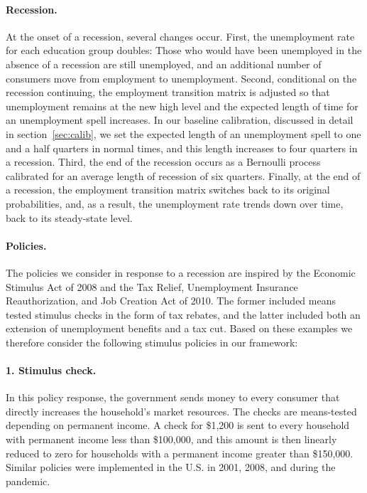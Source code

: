\documentclass[\econtexRoot/HAFiscal]{subfiles}
\begin{document}
\paragraph{Recession.} At the onset of a recession, several changes occur. First, the unemployment rate for each education group doubles: Those who would have been unemployed in the absence of a recession are still unemployed, and an additional number of consumers move from employment to unemployment. Second, conditional on the recession continuing, the employment transition matrix is adjusted so that unemployment remains at the new high level and the expected length of time for an unemployment spell increases. In our baseline calibration, discussed in detail in section~\ref{sec:calib}, we set the expected length of an unemployment spell to one and a half quarters in normal times, and this length increases to four quarters in a recession. Third, the end of the recession occurs as a Bernoulli process calibrated for an average length of recession of six quarters. Finally, at the end of a recession, the employment transition matrix switches back to its original probabilities, and, as a result, the unemployment rate trends down over time, back to its steady-state level.

\paragraph{Policies.} The policies we consider in response to a recession are inspired by the Economic Stimulus Act of 2008 and the Tax Relief, Unemployment Insurance Reauthorization, and Job Creation Act of 2010. The former included means tested stimulus checks in the form of tax rebates, and the latter included both an extension of unemployment benefits and a tax cut. Based on these examples we therefore consider the following stimulus policies in our framework: 

\paragraph{1. Stimulus check.} In this policy response, the government sends money to every consumer that directly increases the household's market resources. The checks are means-tested depending on permanent income. A check for \$1,200 is sent to every household with permanent income less than \$100,000, and this amount is then linearly reduced to zero for households with a permanent income greater than \$150,000. Similar policies were implemented in the U.S. in 2001, 2008, and during the pandemic.
\end{document}
